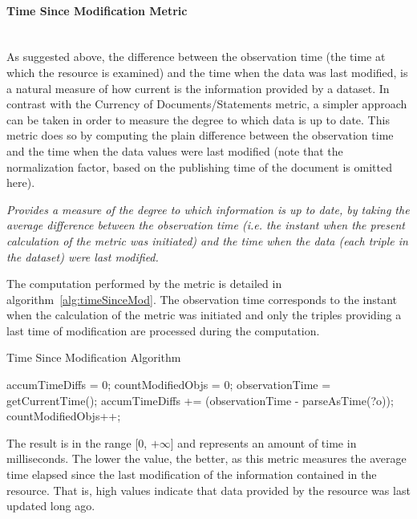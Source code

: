 \paragraph{Time Since Modification Metric} ~\\ %
As suggested above, the difference between the observation time (the time at which the resource is examined) and the time when the data was last modified, is a natural measure of how current is the information provided by a dataset. In contrast with the Currency of Documents/Statements metric, a simpler approach can be taken in order to measure the degree to which data is up to date. This metric does so by computing the plain difference between the observation time and the time when the data values were last modified (note that the normalization factor, based on the publishing time of the document is omitted here).
\begin{mdframed}[style=metricdefinition]
\emph{Provides a measure of the degree to which information is up to date, by taking the average difference between the observation time (i.e. the instant when the present calculation of the metric was initiated) and the time when the data (each triple in the dataset) were last modified.}
\end{mdframed}

The computation performed by the metric is detailed in algorithm~\ref{alg:timeSinceMod}. The observation time corresponds to the instant when the calculation of the metric was initiated and only the triples providing a last time of modification are processed during the computation.
\begin{algorithm}
\caption{Time Since Modification Algorithm} \label{alg:timeSinceMod}
\begin{algorithmic}[1]
\State accumTimeDiffs = 0;
\State countModifiedObjs = 0;
\State observationTime = getCurrentTime();
\EndProcedure
{}
\State accumTimeDiffs += (observationTime - parseAsTime(?o));
\State countModifiedObjs++;
\EndIf ~\\
\EndProcedure
\end{algorithmic}
\end{algorithm}
The result is in the range [0, $+\infty$] and represents an amount of time in milliseconds. The lower the value, the better, as this metric measures the average time elapsed since the last modification of the information contained in the resource. That is, high values indicate that data provided by the resource was last updated long ago.

